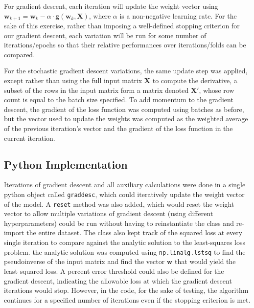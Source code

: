 \documentclass{article}
\begin{document}
For gradient descent, each iteration will update the weight vector using $\mathbf{w}_{k+1} = \mathbf{w}_{k} - \alpha \cdot \mathbf{g}(\mathbf{w}_{k}, \mathbf{X})$, where $\alpha$ is a non-negative learning rate. For the sake of this exercise, rather than imposing a well-defined stopping criterion for our gradient descent, each variation will be run for some number of iterations/epochs so that their relative performances over iterations/folds can be compared.

For the stochastic gradient descent variations, the same update step was applied, except rather than using the full input matrix $\mathbf{X}$ to compute the derivative, a subset of the rows in the input matrix form a matrix denoted $\mathbf{X'}$, whose row count is equal to the batch size specified. To add momentum to the gradient descent, the gradient of the loss function was computed using batches as before, but the vector used to update the weights was computed as the weighted average of the previous iteration's vector and the gradient of the loss function in the current iteration.

\subsection{Python Implementation}
Iterations of gradient descent and all auxiliary calculations were done in a single python object called \verb+graddesc+, which could iteratively update the weight vector of the model. A \verb+reset+ method was also added, which would reset the weight vector to allow multiple variations of gradient descent (using different hyperparameters) could be run without having to reinstantiate the class and re-import the entire dataset. The class also kept track of the squared loss at every single iteration to compare against the analytic solution to the least-squares loss problem. the analytic solution was computed using \verb+np.linalg.lstsq+ to find the pseudoinverse of the input matrix and find the vector $\mathbf{w}$ that would yield the least squared loss. A percent error threshold could also be defined for the gradient descent, indicating the allowable loss at which the gradient descent iterations would stop. However, in the code, for the sake of testing, the algorithm continues for a specified number of iterations even if the stopping criterion is met.
\end{document}
